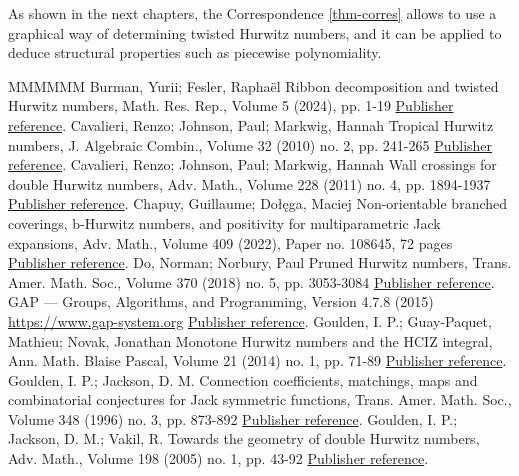 \documentclass[11pt]{article}
\theoremstyle{definition}
\numberwithin{equation}{section}
\begin{document}
As shown in the next chapters, the Correspondence \cref{thm-corres} allows to use a graphical way of determining twisted Hurwitz numbers, and it can be applied to deduce structural properties such as piecewise polynomiality.
\begin{thebibliography}{MMMMMM}
 Burman, Yurii; Fesler, Raphaël Ribbon decomposition and twisted Hurwitz numbers, Math. Res. Rep., Volume 5 (2024), pp. 1-19 \href{https://alco.centre-mersenne.org/articles/10.5802/alco.368/#BF21}{Publisher reference}.
 Cavalieri, Renzo; Johnson, Paul; Markwig, Hannah Tropical Hurwitz numbers, J. Algebraic Combin., Volume 32 (2010) no. 2, pp. 241-265 \href{https://alco.centre-mersenne.org/articles/10.5802/alco.368/#CJM10}{Publisher reference}.
 Cavalieri, Renzo; Johnson, Paul; Markwig, Hannah Wall crossings for double Hurwitz numbers, Adv. Math., Volume 228 (2011) no. 4, pp. 1894-1937 \href{https://alco.centre-mersenne.org/articles/10.5802/alco.368/#CJM11}{Publisher reference}.
 Chapuy, Guillaume; Dołęga, Maciej Non-orientable branched coverings, b-Hurwitz numbers, and positivity for multiparametric Jack expansions, Adv. Math., Volume 409 (2022), Paper no. 108645, 72 pages \href{https://alco.centre-mersenne.org/articles/10.5802/alco.368/#chapuy2020non}{Publisher reference}.
 Do, Norman; Norbury, Paul Pruned Hurwitz numbers, Trans. Amer. Math. Soc., Volume 370 (2018) no. 5, pp. 3053-3084 \href{https://alco.centre-mersenne.org/articles/10.5802/alco.368/#do2018pruned}{Publisher reference}.
 GAP — Groups, Algorithms, and Programming, Version 4.7.8 (2015) \url{https://www.gap-system.org} \href{https://alco.centre-mersenne.org/articles/10.5802/alco.368/#GAP4}{Publisher reference}.
 Goulden, I. P.; Guay-Paquet, Mathieu; Novak, Jonathan Monotone Hurwitz numbers and the HCIZ integral, Ann. Math. Blaise Pascal, Volume 21 (2014) no. 1, pp. 71-89 \href{https://alco.centre-mersenne.org/articles/10.5802/alco.368/#goulden2014monotone}{Publisher reference}.
 Goulden, I. P.; Jackson, D. M. Connection coefficients, matchings, maps and combinatorial conjectures for Jack symmetric functions, Trans. Amer. Math. Soc., Volume 348 (1996) no. 3, pp. 873-892 \href{https://alco.centre-mersenne.org/articles/10.5802/alco.368/#goulden1996connection}{Publisher reference}.
 Goulden, I. P.; Jackson, D. M.; Vakil, R. Towards the geometry of double Hurwitz numbers, Adv. Math., Volume 198 (2005) no. 1, pp. 43-92 \href{https://alco.centre-mersenne.org/articles/10.5802/alco.368/#GJV05}{Publisher reference}.

\end{thebibliography}
\end{document}
